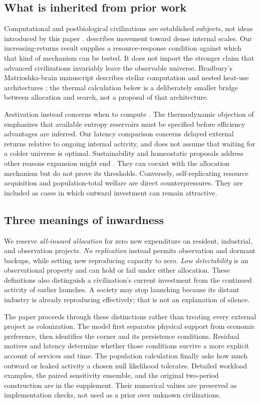 \subsection{What is inherited from prior work}
Computational and postbiological civilizations are established subjects,
not ideas introduced by this paper \citep{Dick2003,CirkovicBradbury2006}.
\citet{Smart2012} describes movement toward dense internal scales. Our
increasing-returns result supplies a resource-response condition against
which that kind of mechanism can be tested. It does not import the stronger
claim that advanced civilizations invariably leave the observable universe.
Bradbury's Matrioshka-brain manuscript describes stellar computation and
nested heat-use architectures \citep{Bradbury1999}; the thermal calculation
below is a deliberately smaller bridge between allocation and search,
not a proposal of that architecture.

Aestivation instead concerns when to compute \citep{Sandberg2017}. The
thermodynamic objection of \citet{BennettHansonRiedel2019} emphasizes that
available entropy reservoirs must be specified before efficiency advantages
are inferred. Our latency comparison concerns delayed external returns
relative to ongoing internal activity, and does not assume that waiting
for a colder universe is optimal. Sustainability and homeostatic proposals
address other reasons expansion might end \citep{HaqqMisraBaum2009,WongBartlett2022}.
They can coexist with the allocation mechanism but do not prove its
thresholds. Conversely, self-replicating resource acquisition
\citep{ArmstrongSandberg2013} and population-total welfare
\citep{Bostrom2003Waste} are direct counterpressures. They are included as
cases in which outward investment can remain attractive.

\subsection{Three meanings of inwardness}
We reserve \emph{all-inward allocation} for zero new expenditure on resident,
industrial, and observation projects. \emph{No replication} instead permits
observation and dormant backups, while setting new reproducing capacity
to zero. \emph{Low detectability} is an observational property and can hold
or fail under either allocation. These definitions also distinguish a
civilization's current investment from the continued activity of earlier
launches. A society may stop launching because its distant industry is
already reproducing effectively; that is not an explanation of silence.

The paper proceeds through these distinctions rather than treating every
external project as colonization. The model first separates physical
support from economic preference, then identifies the corner and its
persistence conditions. Residual motives and latency determine whether
those conditions survive a more explicit account of services and time.
The population calculation finally asks how much outward or leaked activity
a chosen null likelihood tolerates. Detailed workload examples, the paired
sensitivity ensemble, and the original two-period construction are in the
supplement. Their numerical values are preserved as implementation checks,
not used as a prior over unknown civilizations.
